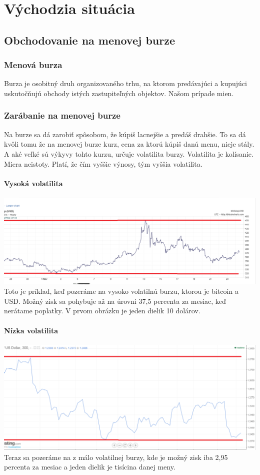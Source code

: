 \chapter{Východzia situácia}\label{chap:intro} 
\section{Obchodovanie na menovej burze}
\subsection{Menová burza}  
Burza je osobitný druh organizovaného trhu, na ktorom predávajúci a kupujúci uskutočňujú obchody istých zastupiteľných objektov. Našom prípade mien.
\subsection{Zarábanie na menovej burze}
Na burze sa dá zarobiť spôsobom, že kúpiš lacnejšie a predáš drahšie. To sa dá kvôli tomu že na menovej burze kurz, cena za ktorú kúpiš danú menu, nieje stály. A aké veľké sú výkyvy tohto kurzu, určuje volatilita burzy.
Volatilita\cite{Volatilita} je kolísanie. Miera neistoty. Platí, že čím vyššie výnosy, tým vyššia volatilita. 
\subsubsection{Vysoká volatilita} 
\includegraphics[width=1\textwidth]{obr} 
Toto je príklad, keď pozeráme na vysoko volatilnú burzu, ktorou je bitcoin a USD. Možný zisk sa pohybuje až na úrovni 37,5 percenta za mesiac, keď nerátame poplatky. V prvom obrázku je jeden dielik 10 dolárov.   
\subsubsection{Nízka volatilita}  
\includegraphics[width=1\textwidth]{obr2} 
Teraz sa pozeráme na   z málo volatilnej burzy, kde je  možný zisk iba 2,95 percenta za mesiac a jeden dielik je tisícina danej meny.   
